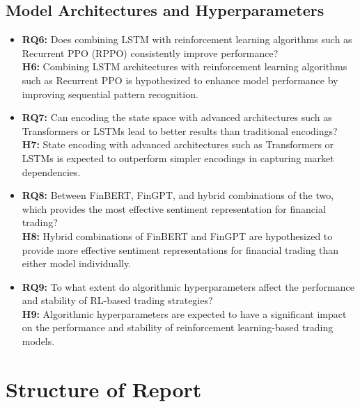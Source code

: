 \documentclass[12pt,a4paper]{report}
\begin{document}
\subsection*{Model Architectures and Hyperparameters}
\begin{itemize}
    \item \textbf{RQ6:} Does combining LSTM with reinforcement learning algorithms such as Recurrent PPO (RPPO) consistently improve performance? \\
    \textbf{H6:} Combining LSTM architectures \cite{hochreiter1997lstm} with reinforcement learning algorithms such as Recurrent PPO is hypothesized to enhance model performance by improving sequential pattern recognition.
    
    \item \textbf{RQ7:} Can encoding the state space with advanced architectures such as Transformers or LSTMs lead to better results than traditional encodings? \\
    \textbf{H7:} State encoding with advanced architectures such as Transformers \cite{vaswani2017attention} or LSTMs \cite{hochreiter1997lstm} is expected to outperform simpler encodings in capturing market dependencies.
    
    \item \textbf{RQ8:} Between FinBERT, FinGPT, and hybrid combinations of the two, which provides the most effective sentiment representation for financial trading? \\
    \textbf{H8:} Hybrid combinations of FinBERT and FinGPT are hypothesized to provide more effective sentiment representations for financial trading than either model individually.
    
    \item \textbf{RQ9:} To what extent do algorithmic hyperparameters affect the performance and stability of RL-based trading strategies? \\
    \textbf{H9:} Algorithmic hyperparameters are expected to have a significant impact on the performance and stability of reinforcement learning-based trading models.
\end{itemize}




\section{Structure of Report}
\end{document}

